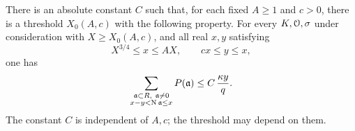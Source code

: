 \begin{proposition}\label{prop:ord-weighted-intervals}
There is an absolute constant \(C\) such that, for each fixed
\(A\ge1\) and \(c>0\), there is a threshold \(X_0(A,c)\) with the
following property.  For every \(K,\mathcal O,\sigma\) under consideration
with \(X\ge X_0(A,c)\), and all real \(x,y\) satisfying
\[
 X^{3/4}\le x\le AX,\qquad cx\le y\le x,
\]
one has
\begin{equation}\label{eq:ord-weighted-interval}
 \sum_{\substack{\mathfrak a\subset R,\ \mathfrak a\ne0\\
                  x-y<\operatorname{N}\mathfrak a\le x}}P(\mathfrak a)
       \le C\,\frac{\kappa y}{q}.
\end{equation}
The constant \(C\) is independent of \(A,c\); the threshold may
depend on them.
\end{proposition}

